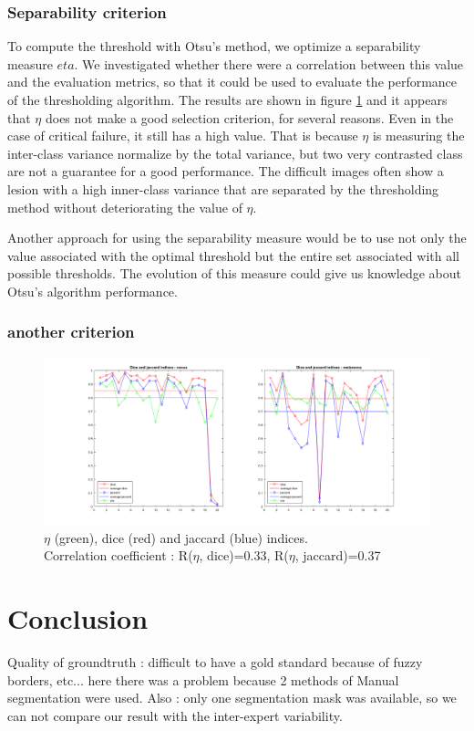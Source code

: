 \documentclass[a4paper,10pt]{article}
\begin{document}
\subsubsection{Separability criterion}
To compute the threshold with Otsu's method, we optimize a separability measure $eta$. We investigated whether there were a correlation between this value and the evaluation metrics, so that it could be used to evaluate the performance of the thresholding algorithm. The results are shown in figure \ref{fig:eta-correlation} and it appears that $\eta$ does not make a good selection criterion, for several reasons. Even in the case of critical failure, it still has a high value. That is because $\eta$ is measuring the inter-class variance normalize by the total variance, but two very contrasted class are not a guarantee for a good performance. The difficult images often show a lesion with a high inner-class variance that are separated by the thresholding method without deteriorating the value of $\eta$.

Another approach for using the separability measure would be to use not only the value associated with the optimal threshold but the entire set associated with all possible thresholds. The evolution of this measure could give us knowledge about Otsu's algorithm performance.

\subsubsection{another criterion}

\begin{figure}
\centering
\includegraphics[width=0.9\linewidth]{../results/otsu-dice-jaccard-eta-plot}
\caption{$\eta$ (green), dice (red) and jaccard (blue) indices.\\ Correlation coefficient : R($\eta$, dice)=0.33, R($\eta$, jaccard)=0.37 }
\label{fig:eta-correlation}
\end{figure}


\section*{Conclusion}
 Quality of groundtruth : difficult to have a gold standard because of fuzzy borders, etc... here there was a problem because 2 methods of Manual segmentation were used. Also : only one segmentation mask was available, so we can not compare our result with the inter-expert variability.
\end{document}
